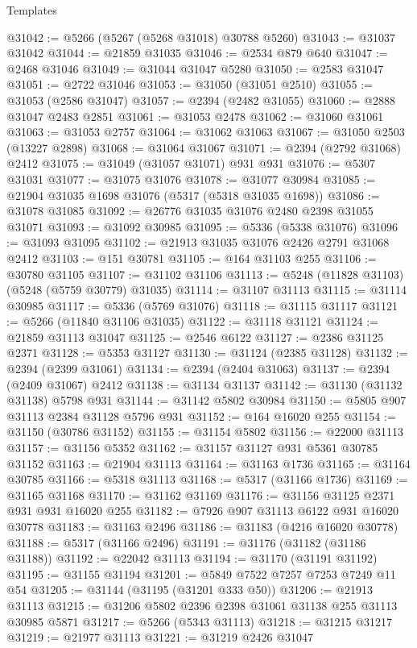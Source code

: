 \begin{lexlean}{Templates}
\begin{coremodule}
@31042 := @5266 (@5267 (@5268 @31018) @30788 @5260)
@31043 := @31037 @31042
@31044 := @21859 @31035
@31046 := @2534 @879 @640
@31047 := @2468 @31046
@31049 := @31044 @31047 @5280
@31050 := @2583 @31047
@31051 := @2722 @31046
@31053 := @31050 (@31051 @2510)
@31055 := @31053 (@2586 @31047)
@31057 := @2394 (@2482 @31055)
@31060 := @2888 @31047 @2483 @2851
@31061 := @31053 @2478
@31062 := @31060 @31061
@31063 := @31053 @2757
@31064 := @31062 @31063
@31067 := @31050 @2503 (@13227 @2898)
@31068 := @31064 @31067
@31071 := @2394 (@2792 @31068) @2412
@31075 := @31049 (@31057 @31071) @931 @931
@31076 := @5307 @31031
@31077 := @31075 @31076
@31078 := @31077 @30984
@31085 := @21904 @31035 @1698 @31076 (@5317 (@5318 @31035 @1698))
@31086 := @31078 @31085
@31092 := @26776 @31035 @31076 @2480 @2398 @31055 @31071
@31093 := @31092 @30985
@31095 := @5336 (@5338 @31076)
@31096 := @31093 @31095
@31102 := @21913 @31035 @31076 @2426 @2791 @31068 @2412
@31103 := @151 @30781
@31105 := @164 @31103 @255
@31106 := @30780 @31105
@31107 := @31102 @31106
@31113 := @5248 (@11828 @31103) (@5248 (@5759 @30779) @31035)
@31114 := @31107 @31113
@31115 := @31114 @30985
@31117 := @5336 (@5769 @31076)
@31118 := @31115 @31117
@31121 := @5266 (@11840 @31106 @31035)
@31122 := @31118 @31121
@31124 := @21859 @31113 @31047
@31125 := @2546 @6122
@31127 := @2386 @31125 @2371
@31128 := @5353 @31127
@31130 := @31124 (@2385 @31128)
@31132 := @2394 (@2399 @31061)
@31134 := @2394 (@2404 @31063)
@31137 := @2394 (@2409 @31067) @2412
@31138 := @31134 @31137
@31142 := @31130 (@31132 @31138) @5798 @931
@31144 := @31142 @5802 @30984
@31150 := @5805 @907 @31113 @2384 @31128 @5796 @931
@31152 := @164 @16020 @255
@31154 := @31150 (@30786 @31152)
@31155 := @31154 @5802
@31156 := @22000 @31113
@31157 := @31156 @5352
@31162 := @31157 @31127 @931 @5361 @30785 @31152
@31163 := @21904 @31113
@31164 := @31163 @1736
@31165 := @31164 @30785
@31166 := @5318 @31113
@31168 := @5317 (@31166 @1736)
@31169 := @31165 @31168
@31170 := @31162 @31169
@31176 := @31156 @31125 @2371 @931 @931 @16020 @255
@31182 := @7926 @907 @31113 @6122 @931 @16020 @30778
@31183 := @31163 @2496
@31186 := @31183 (@4216 @16020 @30778)
@31188 := @5317 (@31166 @2496)
@31191 := @31176 (@31182 (@31186 @31188))
@31192 := @22042 @31113
@31194 := @31170 (@31191 @31192)
@31195 := @31155 @31194
@31201 := @5849 @7522 @7257 @7253 @7249 @11 @54
@31205 := @31144 (@31195 (@31201 @333 @50))
@31206 := @21913 @31113
@31215 := @31206 @5802 @2396 @2398 @31061 @31138 @255 @31113 @30985 @5871
@31217 := @5266 (@5343 @31113)
@31218 := @31215 @31217
@31219 := @21977 @31113
@31221 := @31219 @2426 @31047

\end{coremodule}
\end{lexlean}

